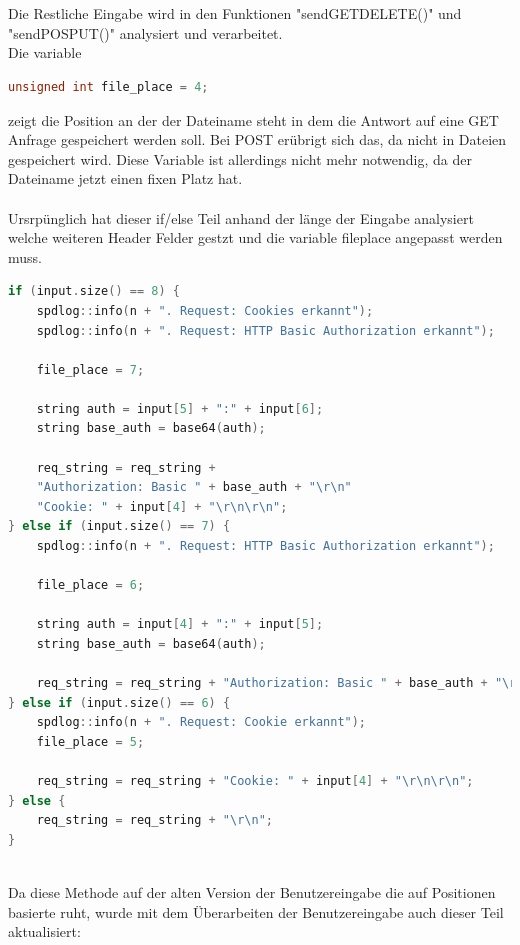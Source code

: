 \documentclass{article}
\begin{document}
\\
\\
Die Restliche Eingabe wird in den Funktionen "send\textunderscore GET\textunderscore DELETE()" und "send\textunderscore POS\textunderscore PUT()" analysiert und verarbeitet.\\
Die variable
\begin{lstlisting}[language=C++]
unsigned int file_place = 4;
\end{lstlisting}
zeigt die Position an der der Dateiname steht in dem die Antwort auf eine GET Anfrage gespeichert werden soll. Bei POST erübrigt sich das, da nicht in Dateien gespeichert wird. Diese Variable ist allerdings nicht mehr notwendig, da der Dateiname jetzt einen fixen Platz hat.
\\
\\
Ursrpünglich hat dieser if/else Teil  anhand der länge der Eingabe analysiert welche weiteren Header Felder gestzt und die variable file\textunderscore place angepasst werden muss.
\begin{lstlisting}[language=C++]
if (input.size() == 8) {
    spdlog::info(n + ". Request: Cookies erkannt");
    spdlog::info(n + ". Request: HTTP Basic Authorization erkannt");

    file_place = 7;

    string auth = input[5] + ":" + input[6];
    string base_auth = base64(auth);

    req_string = req_string + 
    "Authorization: Basic " + base_auth + "\r\n"
    "Cookie: " + input[4] + "\r\n\r\n";        
} else if (input.size() == 7) {
    spdlog::info(n + ". Request: HTTP Basic Authorization erkannt");

    file_place = 6;

    string auth = input[4] + ":" + input[5];
    string base_auth = base64(auth);

    req_string = req_string + "Authorization: Basic " + base_auth + "\r\n\r\n";
} else if (input.size() == 6) {
    spdlog::info(n + ". Request: Cookie erkannt");
    file_place = 5;

    req_string = req_string + "Cookie: " + input[4] + "\r\n\r\n";
} else {
    req_string = req_string + "\r\n";
}
\end{lstlisting}
\\
Da diese Methode auf der alten Version der Benutzereingabe die auf Positionen basierte ruht, wurde mit dem Überarbeiten der Benutzereingabe auch dieser Teil aktualisiert:
\end{document}
